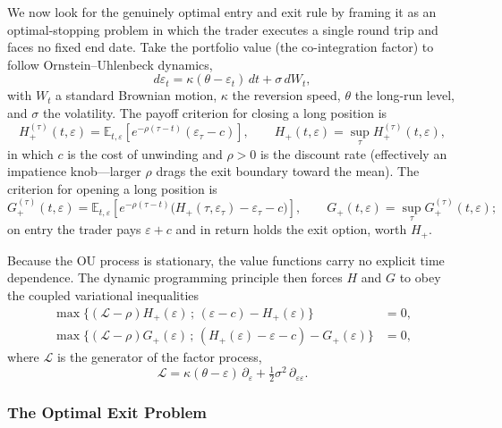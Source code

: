 \documentclass[11pt]{article}
\newcommand{\E}{\mathbb{E}}
\newcommand{\eps}{\varepsilon}
\newcommand{\dd}{\,d}
\DeclareMathOperator*{\supop}{sup}
\begin{document}
We now look for the genuinely optimal entry and exit rule by framing it as an optimal-stopping problem
in which the trader executes a single round trip and faces no fixed end date. Take the portfolio value
(the co-integration factor) to follow Ornstein--Uhlenbeck dynamics,
\begin{equation}
  d\eps_t = \kappa(\theta - \eps_t)\dd t + \sigma \dd W_t,
\end{equation}
with $W_t$ a standard Brownian motion, $\kappa$ the reversion speed, $\theta$ the long-run level, and
$\sigma$ the volatility. The payoff criterion for closing a long position is
\begin{equation}
  H_+^{(\tau)}(t,\eps) = \E_{t,\eps}\!\left[ e^{-\rho(\tau - t)}(\eps_\tau - c) \right],
  \qquad
  H_+(t,\eps) = \supop_{\tau} H_+^{(\tau)}(t,\eps),
\end{equation}
in which $c$ is the cost of unwinding and $\rho>0$ is the discount rate (effectively an impatience
knob---larger $\rho$ drags the exit boundary toward the mean). The criterion for opening a long
position is
\begin{equation}
  G_+^{(\tau)}(t,\eps) = \E_{t,\eps}\!\left[ e^{-\rho(\tau - t)}\big(H_+(\tau,\eps_\tau) - \eps_\tau - c\big) \right],
  \qquad
  G_+(t,\eps) = \supop_{\tau} G_+^{(\tau)}(t,\eps);
\end{equation}
on entry the trader pays $\eps + c$ and in return holds the exit option, worth $H_+$.

Because the OU process is stationary, the value functions carry no explicit time dependence. The
dynamic programming principle then forces $H$ and $G$ to obey the coupled variational inequalities
\begin{align}
  \max\big\{(\mathcal{L} - \rho)H_+(\eps)\,;\,(\eps - c) - H_+(\eps)\big\} &= 0,\\
  \max\big\{(\mathcal{L} - \rho)G_+(\eps)\,;\,(H_+(\eps) - \eps - c) - G_+(\eps)\big\} &= 0,
\end{align}
where $\mathcal{L}$ is the generator of the factor process,
\begin{equation}
  \mathcal{L} = \kappa(\theta - \eps)\,\partial_\eps + \tfrac{1}{2}\sigma^2\,\partial_{\eps\eps}.
\end{equation}

\subsubsection{The Optimal Exit Problem}
\end{document}
